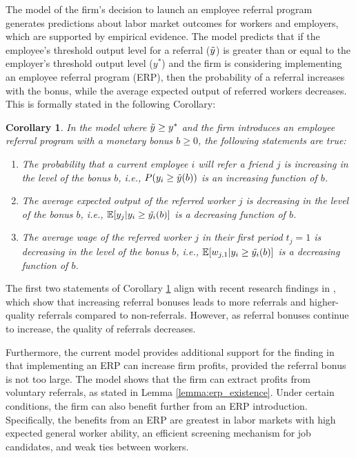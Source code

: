 \documentclass[12pt]{article}
\newtheorem{corollary}[theorem]{Corollary}
\begin{document}
The model of the firm's decision to launch an employee referral program generates predictions about labor market outcomes for workers and employers, which are supported by empirical evidence. The model predicts that if the employee's threshold output level for a referral ($\Tilde{y}$) is greater than or equal to the employer's threshold output level ($y^*$) and the firm is considering implementing an employee referral program (ERP),  then the probability of a referral increases with the bonus, while the average expected output of referred workers decreases. This is formally stated in the following Corollary:

\begin{corollary}\label{cor:erp_emp_evidence}
In the model where $\Tilde{y} \geq y^*$ and the firm introduces an employee referral program with a monetary bonus $b \geq 0$, the following statements are true:
\begin{enumerate}[label = {\roman*)}]
\item The probability that a current employee $i$ will refer a friend $j$ is increasing in the level of the bonus $b$, i.e., $P(y_i\geq \Tilde{y}(b))$ is an increasing function of $b$.
\item The average expected output of the referred worker $j$ is decreasing in the level of the bonus $b$, i.e., $\mathbb{E}[y_j|y_i\geq \Tilde{y_i}(b)]$ is a decreasing function of $b$.
\item The average wage of the referred worker $j$ in their first period $t_j = 1$ is decreasing in the level of the bonus $b$, i.e., $\mathbb{E}[w_{j,1}|y_i\geq \Tilde{y_i}(b)]$ is a decreasing function of $b$.
\end{enumerate}
\end{corollary}

The first two statements of Corollary \ref{cor:erp_emp_evidence} align with recent research findings in \cite{friebel2023employee}, which show that increasing referral bonuses leads to more referrals and higher-quality referrals compared to non-referrals. However, as referral bonuses continue to increase, the quality of referrals decreases. 

Furthermore, the current model provides additional support for the finding in \cite{friebel2023employee} that implementing an ERP can increase firm profits, provided the referral bonus is not too large. The model shows that the firm can extract profits from voluntary referrals, as stated in Lemma \ref{lemma:erp_existence}. Under certain conditions, the firm can also benefit further from an ERP introduction. Specifically, the benefits from an ERP are greatest in labor markets with high expected general worker ability, an efficient screening mechanism for job candidates, and weak ties between workers.
\end{document}
